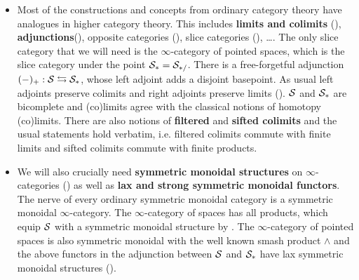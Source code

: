 \begin{itemize}
    \item Most of the constructions and concepts from ordinary category theory have analogues in higher category theory. This includes \textbf{limits and colimits} (\cite[Section~1.2.3, Chapter~4]{HigherToposTheory}), \textbf{adjunctions}(\cite[\href{https://kerodon.net/tag/02EJ}{Tag 02EJ}]{kerodon}), opposite categories (\cite[Section~1.2.1]{HigherToposTheory}), slice categories (\cite[Section~1.2.9]{HigherToposTheory}), \dots. The only slice category that we will need is the $\infty$-category of pointed spaces, which is the slice category under the point $\mathcal{S}_*=\mathcal{S}_{*/}$. There is a free-forgetful adjunction $(-)_+:\mathcal{S}\leftrightarrows \mathcal{S}_*$, whose left adjoint adds a disjoint basepoint. As usual left adjoints preserve colimits and right adjoints preserve limits (\cite[Proposition~5.2.3.5]{HigherToposTheory}). $\mathcal{S}$ and $\mathcal{S}_*$ are bicomplete and (co)limits agree with the classical notions of homotopy (co)limits. There are also notions of \textbf{filtered }and \textbf{sifted colimits }and the usual statements hold verbatim, i.e. filtered colimits commute with finite limits and sifted colimits commute with finite products.
    \item We will also crucially need \textbf{symmetric monoidal structures} on $\infty$-categories (\cite[Definition~2.0.0.7]{lurie2017higher}) as well as \textbf{lax and strong symmetric monoidal functors}. The nerve of every ordinary symmetric monoidal category is a symmetric monoidal $\infty$-category.
    The $\infty$-category of spaces has all products, which equip $\mathcal{S}$ with a symmetric monoidal structure by \cite[Section~2.4.1]{lurie2017higher}.
    The $\infty$-category of pointed spaces is also symmetric monoidal with the well known smash product $\wedge$ and the above functors in the adjunction between $\mathcal{S}$ and $\mathcal{S}_*$ have lax symmetric monoidal structures (\cite[Theorem~2.2.2.4]{lurie2017higher}). 

\end{itemize}
